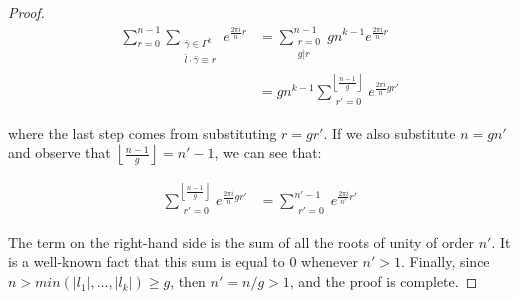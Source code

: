 \documentclass[11pt,a4paper]{tesis}
\theoremstyle{plain}
\theoremstyle{definition}
\begin{document}
\begin{proof}
  \begin{equation*}
    \begin{aligned}
      \sum_{r = 0}^{n - 1}
        \sum_{
          \substack{
            \bar{\gamma} \in \Gamma^k \\
            \bar{l} \cdot \bar{\gamma} \equiv r
          }
        } e^{\frac{2 \pi i}{n} r}
      & = \sum_{\substack{
        r = 0 \\
        g | r
      }}^{n - 1} g n^{k - 1} e^{\frac{2 \pi i}{n} r} \\
      & = g n^{k - 1} \sum_{\substack{
        r' = 0
      }}^{\left\lfloor \frac{n - 1}{g} \right\rfloor} e^{\frac{2 \pi i}{n} g r'}
    \end{aligned}
  \end{equation*}

  where the last step comes from substituting $r = g r'$. If we also substitute $n = g n'$ and observe that $\left\lfloor \frac{n - 1}{g} \right\rfloor = n' - 1$, we can see that:

  \begin{equation*}
    \begin{aligned}
      \sum_{\substack{
        r' = 0
      }}^{\left\lfloor \frac{n - 1}{g} \right\rfloor} e^{\frac{2 \pi i}{n} g r'}
      & = \sum_{\substack{
        r' = 0
      }}^{n' - 1} e^{\frac{2 \pi i}{n'} r'}
    \end{aligned}
  \end{equation*}

  The term on the right-hand side is the sum of all the roots of unity of order $n'$. It is a well-known fact that this sum is equal to $0$ whenever $n' > 1$. Finally, since $n > min(|l_1|, \dots, |l_k|) \ge g$, then $n' = n / g > 1$, and the proof is complete.

\end{proof}
\end{document}
